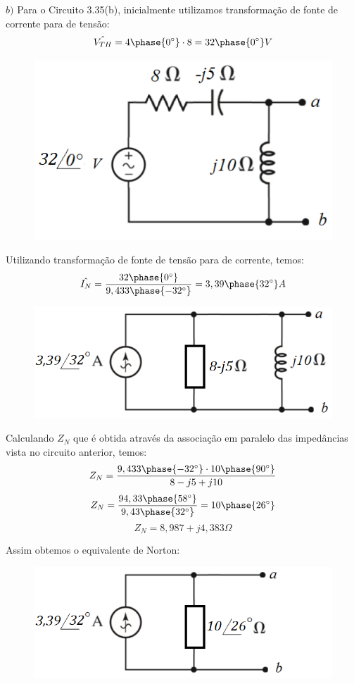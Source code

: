 \documentclass[
	12pt,				%
	oneside,			%
	a4paper,			%
	english,			%
	french,				%
	spanish,			%
	brazil				%
	]{abntex2}
\begin{document}
$b)$ Para o Circuito 3.35(b), inicialmente utilizamos transformação de fonte de corrente para de tensão:
$$\hat{V_{TH}} = 4\phase{0^{\circ}}\cdot 8 = 32\phase{0^{\circ}} V$$

\begin{figure}[htb]
	\centering
	\includegraphics[scale=0.5]{3-35(c).PNG}
\end{figure}

Utilizando transformação de fonte de tensão para de corrente, temos:
$$\hat{I_N} = \dfrac{32\phase{0^{\circ}}}{9,433\phase{-32^{\circ}}} = 3,39\phase{32^{\circ}} A$$

\begin{figure}[htb]
	\centering
	\includegraphics[scale=0.5]{3-35(d).PNG}
\end{figure}

\newpage
Calculando $Z_N$ que é obtida através da associação em paralelo das impedâncias vista no circuito anterior, temos:
$$Z_N = \dfrac{9,433\phase{-32^{\circ}} \cdot 10\phase{90^{\circ}}}{8-j5+j10}$$
$$Z_N = \dfrac{94,33\phase{58^{\circ}}}{9,43\phase{32^{\circ}}} = 10\phase{26^{\circ}}$$
$$Z_N = 8,987 + j4,383 \Omega$$

Assim obtemos o equivalente de Norton:

\begin{figure}[htb]
	\centering
	\includegraphics[scale=0.5]{3-35(e).PNG}
\end{figure}
\end{document}
